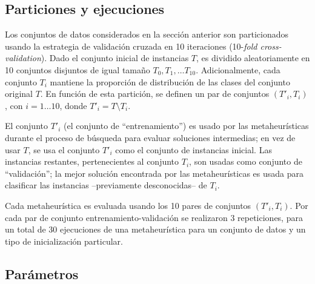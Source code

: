 \subsection{Particiones y ejecuciones}

Los conjuntos de datos considerados en la sección anterior son particionados usando la estrategia de validación cruzada en 10 iteraciones (10-\emph{fold cross-validation}). Dado el conjunto inicial de instancias $T$, es dividido aleatoriamente en 10 conjuntos disjuntos de igual tamaño $T_0, T_1, \dots T_{10}$. Adicionalmente, cada conjunto $T_i$ mantiene la proporción de distribución de las clases del conjunto original $T$. En función de esta partición, se definen un par de conjuntos $(T'_i, T_i)$, con $i = 1 \dots 10$, donde $T'_i = T \setminus T_i$.

El conjunto $T'_i$ (el conjunto de ``entrenamiento'') es usado por las metaheurísticas durante el proceso de búsqueda para evaluar soluciones intermedias; en vez de usar $T$, se usa el conjunto $T'_i$ como el conjunto de instancias inicial. Las instancias restantes, pertenecientes al conjunto $T_i$, son usadas como conjunto de ``validación''; la mejor solución encontrada por las metaheurísticas es usada para clasificar las instancias --previamente desconocidas-- de $T_i$.

Cada metaheurística es evaluada usando los 10 pares de conjuntos $(T'_i, T_i)$. Por cada par de conjunto entrenamiento-validación se realizaron 3 repeticiones, para un total de 30 ejecuciones de una metaheurística para un conjunto de datos y un tipo de inicialización particular.

\subsection{Parámetros}

\blindtext

